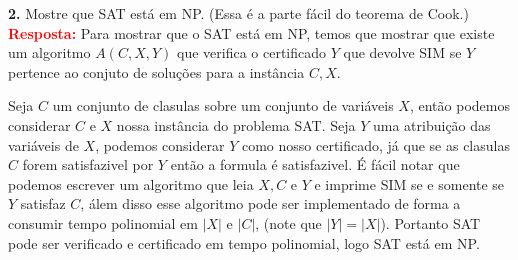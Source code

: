 
\noindent\textbf{2.} Mostre que SAT está em NP. (Essa é a parte fácil do teorema de Cook.)\\[6pt]
\textcolor{red}{\textbf{Resposta:}} Para mostrar que o SAT está em NP, temos que mostrar que existe um algoritmo $A(C,X,Y)$ que verifica o certificado $Y$ que devolve SIM se $Y$ pertence ao conjuto de soluções para a instância $C, X$.

Seja $C$ um conjunto de clasulas sobre um conjunto de variáveis $X$, então 
podemos considerar $C$ e $X$  nossa instância do problema SAT. Seja $Y$ uma 
atribuição das variáveis de $X$, podemos considerar $Y$ como nosso certificado, 
já que se as clasulas $C$ forem satisfazivel por $Y$ então a formula é 
satisfazivel. É fácil notar que podemos escrever um algoritmo que leia $X,C$ e 
$Y$ e imprime SIM se e somente se $Y$ satisfaz $C$, álem disso esse algoritmo 
pode ser implementado de forma a consumir tempo polinomial em $|X|$ e $|C|$, 
(note que $|Y| = |X|$). Portanto SAT pode ser verificado e certificado em tempo 
polinomial, logo SAT está em NP.\\[6pt]
